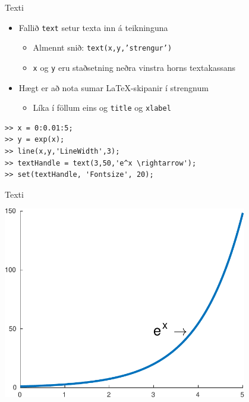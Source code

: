 \documentclass[handout]{beamer}
\begin{document}
\begin{frame}[fragile]{Texti}
\begin{itemize}
 \item Fallið \texttt{text} setur texta inn á teikninguna
 \begin{itemize}
  \item Almennt snið: \texttt{text(x,y,'strengur')}
  \item \texttt{x} og \texttt{y} eru staðsetning neðra vinstra horns textakassans
 \end{itemize}
 \item Hægt er að nota sumar \LaTeX-skipanir í strengnum
 \begin{itemize}
  \item Líka í föllum eins og \texttt{title} og \texttt{xlabel}
 \end{itemize}
\end{itemize}

\begin{verbatim}
>> x = 0:0.01:5;
>> y = exp(x);
>> line(x,y,'LineWidth',3);
>> textHandle = text(3,50,'e^x \rightarrow');
>> set(textHandle, 'Fontsize', 20);
\end{verbatim}

\end{frame}

\begin{frame}{Texti}
\begin{center}
\includegraphics[width=0.8\textwidth]{../Pics/exp-label}
\end{center}
\end{frame}
\end{document}
